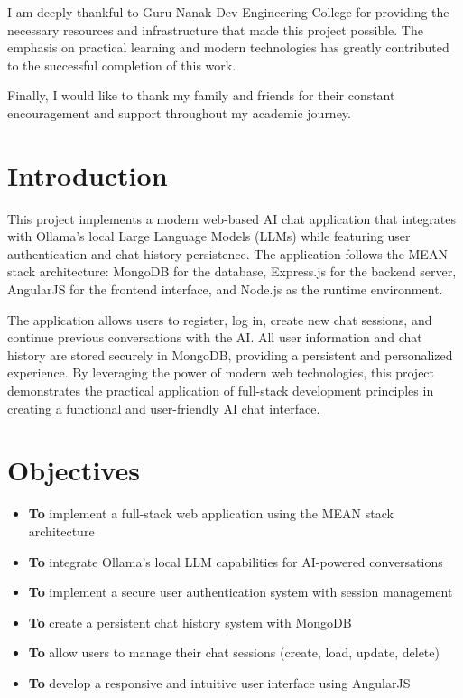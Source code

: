 \documentclass[12pt,a4paper]{article}
\begin{document}
I am deeply thankful to Guru Nanak Dev Engineering College for providing the necessary resources and infrastructure that made this project possible. The emphasis on practical learning and modern technologies has greatly contributed to the successful completion of this work.

Finally, I would like to thank my family and friends for their constant encouragement and support throughout my academic journey.

\newpage

\setcounter{tocdepth}{1}
\setlength{\cftbeforesecskip}{0pt}
\setlength{\cftbeforetoctitleskip}{-1em}
\tableofcontents
\newpage

\section{Introduction}
This project implements a modern web-based AI chat application that integrates with Ollama's local Large Language Models (LLMs) while featuring user authentication and chat history persistence. The application follows the MEAN stack architecture: MongoDB for the database, Express.js for the backend server, AngularJS for the frontend interface, and Node.js as the runtime environment.

The application allows users to register, log in, create new chat sessions, and continue previous conversations with the AI. All user information and chat history are stored securely in MongoDB, providing a persistent and personalized experience. By leveraging the power of modern web technologies, this project demonstrates the practical application of full-stack development principles in creating a functional and user-friendly AI chat interface.

\section{Objectives}
\begin{itemize}
\item \textbf{To} implement a full-stack web application using the MEAN stack architecture
\item \textbf{To} integrate Ollama's local LLM capabilities for AI-powered conversations
\item \textbf{To} implement a secure user authentication system with session management
\item \textbf{To} create a persistent chat history system with MongoDB
\item \textbf{To} allow users to manage their chat sessions (create, load, update, delete)
\item \textbf{To} develop a responsive and intuitive user interface using AngularJS
\end{itemize}
\end{document}
